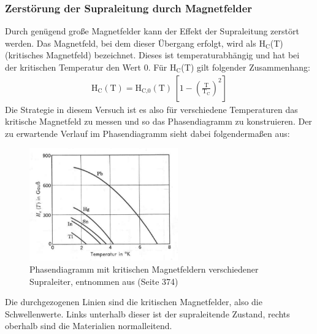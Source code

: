 \documentclass[german,  %
parskip=full,  %
]{scrartcl}
\begin{document}
\subsubsection{Zerstörung der Supraleitung durch Magnetfelder}
Durch genügend große Magnetfelder kann der Effekt der Supraleitung zerstört werden. Das Magnetfeld, bei dem dieser Übergang erfolgt, wird als H$_{\text{C}}$(T) (kritisches Magnetfeld) bezeichnet. Dieses ist temperaturabhängig und hat bei der kritischen Temperatur den Wert $0$. Für H$_{\text{C}}$(T) gilt folgender Zusammenhang:
\begin{align}
\label{h}
\text{H}_{\text{C}}(\text{T}) = \text{H}_{\text{C,0}}( \text{T}) \, \left[1-\left(\frac{\text{T}}{\text{T}_{\text {C}}}\right)^2 \right]
\end{align}
Die Strategie in diesem Versuch ist es also für verschiedene Temperaturen das kritische Magnetfeld zu messen und so das Phasendiagramm zu konstruieren. Der zu erwartende Verlauf im Phasendiagramm sieht dabei folgendermaßen aus:
\begin{figure}[h!]
\centering
\includegraphics[width=0.57\textwidth]{pd_kittel}
\caption{Phasendiagramm mit kritischen Magnetfeldern verschiedener Supraleiter, entnommen aus \cite{5} (Seite 374)}
\end{figure}
\newpage
Die durchgezogenen Linien sind die kritischen Magnetfelder, also die Schwellenwerte. Links unterhalb dieser ist der supraleitende Zustand, rechts oberhalb sind die Materialien normalleitend.
\end{document}
